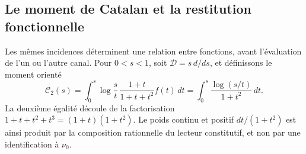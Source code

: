 \subsection{Le moment de Catalan et la restitution fonctionnelle}
\label{hmtfg:articulacion:catalan}

Les mêmes incidences déterminent une relation entre fonctions,
avant l’évaluation de l’un ou l’autre canal. Pour \(0<s<1\), soit
\(\mathcal D=s\,d/ds\), et définissons le moment orienté
\begin{equation}
 \mathcal C_2(s)
 =\int_0^s\log\frac{s}{t}\,
     \frac{1+t}{1+t+t^2}f(t)\,dt
 =\int_0^s\frac{\log(s/t)}{1+t^2}\,dt.
 \label{hmtfg:articulacion:integral}
\end{equation}
La deuxième égalité découle de la factorisation
\(1+t+t^2+t^3=(1+t)(1+t^2)\). Le poids continu et positif
\(dt/(1+t^2)\) est ainsi produit par la composition rationnelle
du lecteur constitutif, et non par une identification à
\(\nu_0\).

